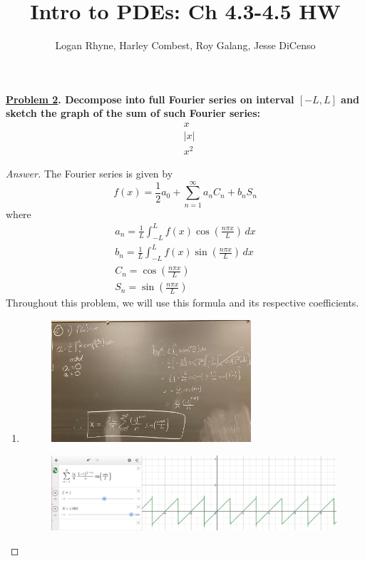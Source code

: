 \documentclass{article}
\title{Intro to PDEs: Ch 4.3-4.5 HW}
\author{Logan Rhyne, Harley Combest, Roy Galang, Jesse DiCenso}
\theoremstyle{definition}
\renewcommand\qedsymbol{$\blacksquare$}
\newenvironment{ans}{\begin{proof}[Answer]\renewcommand{\qedsymbol}{}}{\end{proof}}
\newenvironment{boldenv}{\bfseries\boldmath}{}
\begin{document}
\maketitle

\begin{boldenv}
    \underline{Problem 2}. Decompose into full Fourier series on interval $[-L, L]$ and sketch the graph of the sum of such Fourier series: \begin{align}
        & x\\
        & |x|\\
        & x^2
    \end{align}
\end{boldenv}
\begin{ans}
The Fourier series is given by
\[ f(x) = \frac{1}{2}a_0 + \sum_{n=1}^{\infty} a_nC_n + b_nS_n \]
where \begin{align*}
    a_n = \frac{1}{L} \int_{-L}^L f(x)\cos(\frac{n\pi x}{L})\,dx\\
    b_n = \frac{1}{L} \int_{-L}^L f(x)\sin(\frac{n\pi x}{L})\,dx\\
    C_n = \cos(\frac{n\pi x}{L})\\
    S_n = \sin(\frac{n\pi x}{L})
\end{align*}
Throughout this problem, we will use this formula and its respective coefficients.
    \begin{enumerate}
        \item \phantom{.}
        \begin{figure}[H]
            \centering
            \includegraphics[width = 0.7\textwidth]{Problem 2-1.jpg}
        \end{figure}
        \begin{figure}[H]
            \centering
            \includegraphics[width = \textwidth]{Problem 2.1.png}
        \end{figure}


\end{enumerate}
\end{ans}
\end{document}
